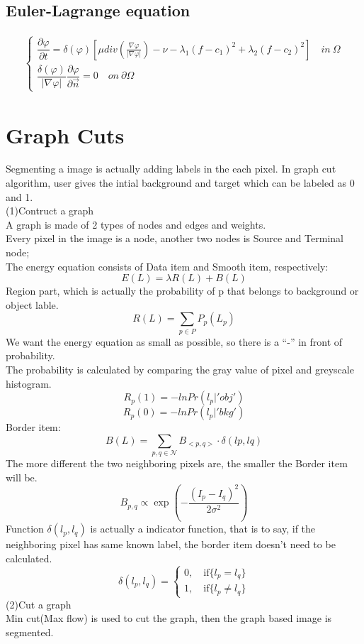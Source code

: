 \documentclass{article}
\begin{document}
\subsection{Euler-Lagrange equation}
\begin{multline}
\left\{ \begin{array}{ll}
\dfrac{\partial\varphi}{\partial t}=\delta(\varphi)[\mu div(\frac{\nabla\varphi}{|\nabla\varphi|})-\nu-\lambda_1(f-c_1)^2+\lambda_2(f-c_2)^2]\quad in\ \Omega\\
\dfrac{\delta(\varphi)}{|\nabla\varphi|}\dfrac{\partial\varphi}{\partial \vec{n}}=0\quad on\ \partial \Omega
\end{array}\right.
\end{multline}
\section{Graph Cuts}
Segmenting a image is actually adding labels in the each pixel. In graph cut algorithm, user gives the intial background and target which can be labeled as 0 and 1.\\
(1)Contruct a graph\\
A graph is made of 2 types of nodes and edges and weights.\\
Every pixel in the image is a node, another two nodes is Source and Terminal node;\\
The energy equation consists of Data item and Smooth item, respectively:
\begin{equation}\label{key}
E(L)=\lambda R(L)+B(L)
\end{equation}
Region part, which is actually the probability of p that belongs to background or object lable.\\
$$
R(L)=\sum_{p\in P}P_p(L_p)
$$
We want the energy equation as small as possible, so there is a ``-'' in front of probability.\\
The probability is calculated by comparing the gray value of pixel and greyscale histogram.
$$
R_p(1)=-lnPr(l_p|'obj')
$$
$$
R_p(0)=-lnPr(l_p|'bkg')
$$
Border item:\\
$$
B(L)=\sum_{p,q\in \mathcal{N}}B_{<p,q>}\cdot\delta(lp,lq)
$$
The more different the two neighboring pixels are, the smaller the Border item will be.
$$
B_{p,q}\propto\exp(-\dfrac{(I_p-I_q)^2}{2\sigma^2})
$$
Function $\delta(l_p,l_q)$ is actually a indicator function, that is to say, if the neighboring pixel has same known label, the border item doesn't need to be calculated.
$$
\delta(l_p,l_q)=\left\{ \begin{array}{ll}
0,\quad \mathrm{if} \{l_p=l_q\}\\
1,\quad \mathrm{if} \{l_p\neq l_q\}
\end{array}\right.
$$
(2)Cut a graph\\
Min cut(Max flow) is used to cut the graph, then the graph based image is segmented.
\end{document}
